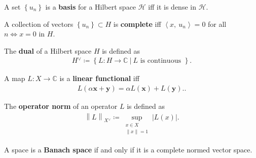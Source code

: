 \begin{definition}

A set \(\left\{{u_{n}}\right\}\) is a \textbf{basis} for a Hilbert space
\({\mathcal{H}}\) iff it is dense in \({\mathcal{H}}\).

\end{definition}

\begin{definition}

A collection of vectors \(\left\{{u_{n}}\right\}\subset H\) is
\textbf{complete} iff \({\left\langle {x},~{u_{n}} \right\rangle} = 0\)
for all \(n \iff x = 0\) in \(H\).

\end{definition}

\begin{definition}

The \textbf{dual} of a Hilbert space \(H\) is defined as
\begin{align*}
H {}^{ \vee }\coloneqq\left\{{L: H\to {\mathbb{C}}{~\mathrel{\Big|}~}L \text{ is continuous }}\right\}
.\end{align*}

\end{definition}

\begin{definition}

A map \(L: X \to {\mathbb{C}}\) is a \textbf{linear functional} iff
\begin{align*}
L(\alpha\mathbf{x} + \mathbf{y}) = \alpha L(\mathbf{x}) + L(\mathbf{y}).
.\end{align*}

\end{definition}

\begin{definition}

The \textbf{operator norm} of an operator \(L\) is defined as
\begin{align*}
{\left\lVert {L} \right\rVert}_{X {}^{ \vee }} \coloneqq\sup_{ \substack{x\in X \\ {\left\lVert {x} \right\rVert} = 1} } {\left\lvert {L(x)} \right\rvert}
.\end{align*}

\end{definition}

\begin{definition}

A space is a \textbf{Banach space} if and only if it is a complete
normed vector space.

\end{definition}

